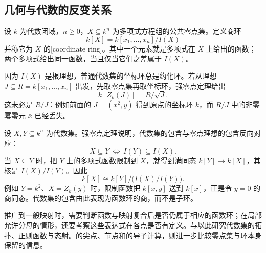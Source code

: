 \subsection{几何与代数的反变关系}\label{b3:subsec:0603:03}

\begin{definition}\label{b3:def:affine-coordinate-ring}
	设 \(k\) 为代数闭域，\(n\ge0\)，\(X\subseteq k^n\) 为多项式方程组的公共零点集。定义商环
	\[
		k[X]=k[x_1,\ldots,x_n]/I(X)
	\]
	并称它为 \(X\) 的[coordinate ring]。其中一个元素就是多项式在 \(X\) 上给出的函数；两个多项式给出同一函数，当且仅当它们之差属于 \(I(X)\)。
\end{definition}

因为 \(I(X)\) 是根理想，普通代数集的坐标环总是约化环。若从理想 \(J\subseteq R=k[x_1,\ldots,x_n]\) 出发，先取零点集再取坐标环，强零点定理给出
\[
	k[Z_k(J)]=R/\sqrt J.
\]
这未必是 \(R/J\)：例如前面的 \(J=(x^2,y)\) 得到原点的坐标环 \(k\)，而 \(R/J\) 中的非零幂零元 \(\bar x\) 已经丢失。

设 \(X,Y\subseteq k^n\) 为代数集。强零点定理说明，代数集的包含与零点理想的包含反向对应：
\[
	X\subseteq Y\ \Longleftrightarrow\ I(Y)\subseteq I(X).
\]
当 \(X\subseteq Y\) 时，把 \(Y\) 上的多项式函数限制到 \(X\)，就得到满同态 \(k[Y]\rightarrow k[X]\)，其核是 \(I(X)/I(Y)\)。因此
\[
	k[X]\cong k[Y]\big/\bigl(I(X)/I(Y)\bigr).
\]
例如 \(Y=k^2\)、\(X=Z_k(y)\) 时，限制函数把 \(k[x,y]\) 送到 \(k[x]\)，正是令 \(y=0\) 的商同态。代数集的包含由此表现为函数环的商，而不是子环。

\ProseParagraphBreak
推广到一般映射时，需要判断函数与映射复合后是否仍属于相应的函数环；在局部允许分母的情形，还要考察这些表达式在各点是否有定义。与以此研究代数集的拓扑、正则函数与态射。的尖点、节点和的导子计算，则进一步比较零点集与环本身保留的信息。
